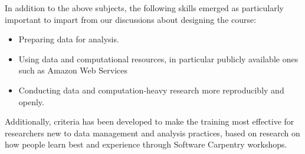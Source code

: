 \documentclass[15]{idcc}
\begin{document}
In addition to the above subjects, the following skills emerged as particularly important to impart from our discussions about designing the course:
\begin{itemize}
\item Preparing data for analysis.
\item Using data and computational resources, in particular publicly available ones such as Amazon Web Services
\item Conducting data and computation-heavy research more reproducibly and openly.
\end{itemize}

Additionally, criteria has been developed to make the training most effective for researchers new to data management and analysis practices, based on research on how people
learn best and experience through Software Carpentry workshops.
\end{document}
